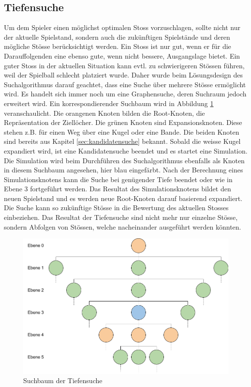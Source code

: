\subsection{Tiefensuche}
Um dem Spieler einen möglichst optimalen Stoss vorzuschlagen, sollte nicht nur der aktuelle Spielstand,
sondern auch die zukünftigen Spielstände und deren mögliche Stösse berücksichtigt werden.
Ein Stoss ist nur gut, wenn er für die Darauffolgenden eine ebenso gute, wenn nicht bessere, Ausgangslage bietet.
Ein guter Stoss in der aktuellen Situation kann evtl. zu schwierigeren Stössen führen, weil der Spielball schlecht platziert wurde.
Daher wurde beim Lösungsdesign des Suchalgorithmus darauf geachtet, dass eine Suche über mehrere Stösse ermöglicht wird.
Es handelt sich immer noch um eine Graphensuche, deren Suchraum jedoch erweitert wird.
Ein korrespondierender Suchbaum wird in Abbildung \ref{fig:suchbaum_tiefensuche} veranschaulicht.
Die orangenen Knoten bilden die Root-Knoten, die Repräsentation der Ziellöcher. Die grünen Knoten sind
Expansionsknoten. Diese stehen z.B. für einen Weg über eine Kugel oder eine Bande. Die beiden Knoten sind bereits aus
Kapitel \ref{sec:kandidatensuche} bekannt. Sobald die weisse Kugel expandiert wird, ist eine Kandidatensuche beendet und
es startet eine Simulation. Die Simulation wird beim Durchführen des Suchalgorithmus ebenfalls als Knoten in diesem
Suchbaum angesehen, hier blau eingefärbt. Nach der Berechnung eines Simulationsknotens kann die Suche bei genügender
Tiefe beendet oder wie in Ebene 3 fortgeführt werden. Das Resultat des Simulationsknotens bildet den neuen Spielstand
und es werden neue Root-Knoten darauf basierend expandiert. Die Suche kann so zukünftige Stösse in die Bewertung
des aktuellen Stosses einbeziehen.
Das Resultat der Tiefensuche sind nicht mehr nur einzelne Stösse, sondern Abfolgen von Stössen, welche nacheinander
ausgeführt werden könnten.

\begin{figure}[h!]
    \begin{center}
        \includegraphics[width=0.5\linewidth]{../common/03_billiard_ai/resources/38_tiefensuche_suchbaum.png}
    \end{center}
    \caption{Suchbaum der Tiefensuche}
    \label{fig:suchbaum_tiefensuche}
\end{figure}

